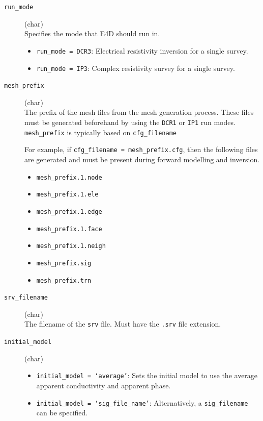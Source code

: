 \documentclass[a4paper,12pt]{article}
\begin{document}
\begin{description}
    \item[\texttt{run\_mode}] (char)\hfill \\
    Specifies the mode that E4D should run in.
    \begin{itemize}
        \item \texttt{run\_mode = DCR3}: Electrical resistivity inversion for a single survey.
        \item \texttt{run\_mode = IP3}: Complex resistivity survey for a single survey.
    \end{itemize}
    
    \item[\texttt{mesh\_prefix}] (char)\hfill \\
    The prefix of the mesh files from the mesh generation process. These files must be generated beforehand by using the \texttt{DCR1} or \texttt{IP1} run modes. \texttt{mesh\_prefix} is typically based on \texttt{cfg\_filename}

    For example, if \texttt{cfg\_filename = mesh\_prefix.cfg}, then the following files are generated and must be present during forward modelling and inversion.

    \begin{itemize}
        \item \texttt{mesh\_prefix.1.node}
        \item \texttt{mesh\_prefix.1.ele}
        \item \texttt{mesh\_prefix.1.edge}
        \item \texttt{mesh\_prefix.1.face}
        \item \texttt{mesh\_prefix.1.neigh}
        \item \texttt{mesh\_prefix.sig}
        \item \texttt{mesh\_prefix.trn}
    \end{itemize}

    \item[\texttt{srv\_filename}] (char)\hfill \\
    The filename of the \texttt{srv} file. Must have the \texttt{.srv} file extension.

    \item[\texttt{initial\_model}] (char)\hfill \\
    \begin{itemize}
        \item \texttt{initial\_model = `average'}: Sets the initial model to use the average apparent conductivity and apparent phase.
        \item \texttt{initial\_model = `sig\_file\_name'}: Alternatively, a \texttt{sig\_filename} can be specified.
    \end{itemize}


\end{description}
\end{document}
